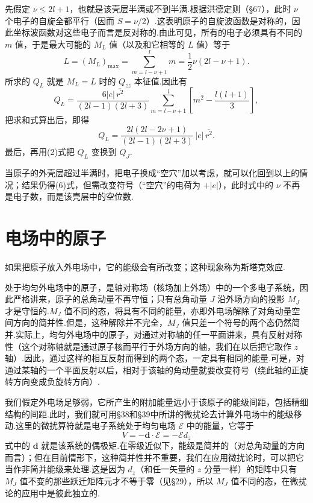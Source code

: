 \begin{xiti}
先假定 $\nu\leqslant2l+1$，也就是该壳层半满或不到半满.根据洪德定则（§67），此时 $\nu$ 个电子的自旋全都平行（因而 $S=\nu/2$）.这表明原子的自旋波函数是对称的，因此坐标波函数对这些电子而言是反对称的.由此可见，所有的电子必须具有不同的 $m$ 值，于是最大可能的 $M_L$ 值（以及和它相等的 $L$ 值）等于
\begin{equation*}
  L=(M_L)_{\max}=\sum_{m=l-\nu+1}^{l}m=\frac{1}{2}\nu(2l-\nu+1).
\end{equation*}
所求的 $Q_L$ 就是 $M_L=L$ 时的 $Q_{zz}$ 本征值.因此有
\begin{equation*}
  Q_L=\frac{6|e|\,\overline{r^{2}}}{(2l-1)(2l+3)}
  \sum_{m=l-\nu+1}^{l}\left[m^{2}-\frac{l(l+1)}{3}\right],
\end{equation*}
把求和式算出后，即得
\begin{equation}
  Q_L=\frac{2l(2l-2\nu+1)}{(2l-1)(2l+3)}\,|e|\,\overline{r^{2}}.
\end{equation}
最后，再用(2)式把 $Q_L$ 变换到 $Q_J$.

当原子的外壳层超过半满时，把电子换成“空穴”加以考虑，就可以化回到以上的情况；结果仍得(6)式，但需改变符号（“空穴”的电荷为 $+|e|$），此时式中的 $\nu$ 不再是电子数，而是该壳层中的空位数.

\end{xiti}
\renewcommand{\theequation}{\arabic{section}.\arabic{equation}}%

\section{电场中的原子}

如果把原子放入外电场中，它的能级会有所改变；这种现象称为斯塔克效应.

处于均匀外电场中的原子，是轴对称场（核场加上外场）中的一个多电子系统，因此严格讲来，原子的总角动量不再守恒；只有总角动量 $J$ 沿外场方向的投影 $M_J$ 才是守恒的.$M_J$ 值不同的态，将具有不同的能量，亦即外电场解除了对角动量空间方向的简并性.但是，这种解除并不完全，$M_J$ 值只差一个符号的两个态仍然简并.实际上，均匀外电场中的原子，对通过对称轴的任一平面讲来，具有反射对称性（这个对称轴就是通过原子核而平行于外场方向的轴，我们在以后把它取作 $z$ 轴）.因此，通过这样的相互反射而得到的两个态，一定具有相同的能量.可是，对通过某轴的一个平面反射以后，相对于该轴的角动量就要改变符号（绕此轴的正旋转方向变成负旋转方向）.

我们假定外电场足够弱，它所产生的附加能量远小于该原子的能级间距，包括精细结构的间距.此时，我们就可用§38和§39中所讲的微扰论去计算外电场中的能级移动.这里的微扰算符就是电子系统处于均匀电场 $\mathcal{E}$ 中的能量，它等于
\begin{equation}
  V=-\boldsymbol{d}\cdot\boldsymbol{\mathcal{E}}=-\mathcal{E}d_z
\end{equation}
式中的 $\boldsymbol{d}$ 就是该系统的偶极矩.在零级近似下，能级是简并的（对总角动量的方向而言）；但在目前情形下，这种简并性并不重要，我们在应用微扰论时，可以把它当作非简并能级来处理.这是因为 $d_z$（和任一矢量的 $z$ 分量一样）的矩阵中只有 $M_J$ 值不变的那些跃迁矩阵元才不等于零（见§29），所以 $M_J$ 值不同的态，在微扰论的应用中是彼此独立的.

